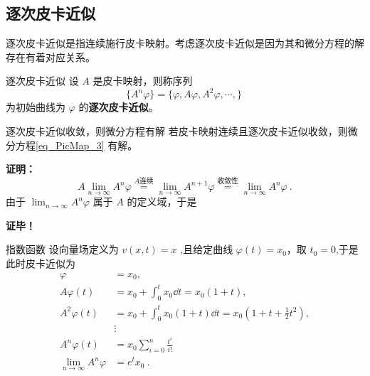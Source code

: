 \subsection{逐次皮卡近似}
逐次皮卡近似是指连续施行皮卡映射。考虑逐次皮卡近似是因为其和微分方程的解存在有着对应关系。
\begin{definition}{逐次皮卡近似}
设 $A$ 是皮卡映射，则称序列
\begin{equation}
\{A^n\varphi\}=\{\varphi, A\varphi, A^2\varphi,\cdots,\}~ 
\end{equation}
为初始曲线为 $\varphi$ 的\textbf{逐次皮卡近似}。
\end{definition}
\begin{theorem}{逐次皮卡近似收敛，则微分方程有解}
若皮卡映射连续且逐次皮卡近似收敛，则微分方程\autoref{eq_PicMap_3} 有解。
\end{theorem}
\textbf{证明：}
\begin{equation}
A\lim_{n\rightarrow\infty}A^n\varphi\overset{A\text{连续}}{=}\lim_{n\rightarrow\infty}A^{n+1}\varphi \overset{\text{收敛性}}{=}\lim_{n\rightarrow\infty}A^n\varphi~.
\end{equation}
由于 $\lim_{n\rightarrow\infty}A^n\varphi$ 属于 $A$ 的定义域，于是


\textbf{证毕！}
\begin{example}{指数函数}
设向量场定义为 $v(x,t)=x$ ,且给定曲线 $\varphi(t)=x_0$，取 $t_0=0$,于是此时皮卡近似为
\begin{equation}
\begin{aligned}
\varphi&=x_0,\\
A\varphi(t)&=x_0+\int_{0}^{t}x_0\dd t=x_0(1+t),\\
A^2\varphi(t)&=x_0+\int_{0}^{t}x_0(1+t)\dd t=x_0(1+t+\frac{1}{2}t^2),\\
&\vdots\\
A^n\varphi(t)&=x_0\sum_{i=0}^n\frac{t^i}{i!}\\
\lim_{n\rightarrow\infty}A^n\varphi&=e^tx_0
~.
\end{aligned}
\end{equation}

\end{example}